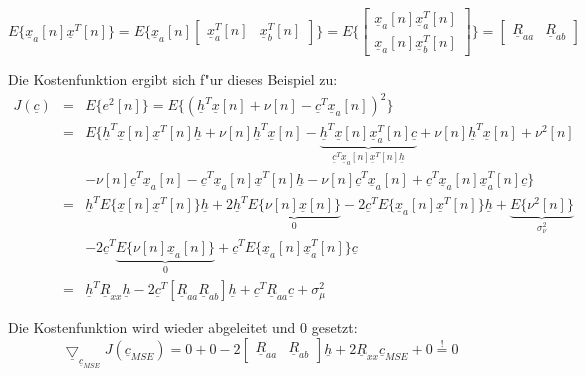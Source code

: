 \begin{equation}
 E\{\underline{x}_a[n] \underline{x}^T[n]\} = E\{\underline{x}_a[n] \begin{bmatrix} \underline{x}_a^T[n] & \underline{x}_b^T[n] \end{bmatrix}\} = E\{\begin{bmatrix} \underline{x}_a[n] \underline{x}_a^T[n] \\ \underline{x}_a[n] \underline{x}_b^T[n] \end{bmatrix}\} = \begin{bmatrix} \underline{R}_{aa} & \underline{R}_{ab} \end{bmatrix}
\end{equation}


Die Kostenfunktion ergibt sich f"ur dieses Beispiel zu:
\begin{eqnarray}
 J(\underline{c}) & = & E\{e^2[n]\} = E\{(\underline{h}^T \underline{x}[n] + \nu [n] - \underline{c}^T \underline{x}_a[n])^2\} \\
 & = & E\{\underline{h}^T \underline{x}[n] \underline{x}^T[n] \underline{h} + \nu [n] \underline{h}^T \underline{x}[n] - \underbrace{\underline{h}^T \underline{x}[n] \underline{x}_a^T[n] \underline{c}}_{\underline{c}^T \underline{x}_a[n] \underline{x}^T[n] \underline{h}} + \nu [n] \underline{h}^T \underline{x}[n] + \nu^2[n] \\
 & & - \nu [n] \underline{c}^T \underline{x}_a[n] - \underline{c}^T \underline{x}_a[n] \underline{x}^T[n] \underline{h} - \nu [n] \underline{c}^T \underline{x}_a[n] + \underline{c}^T \underline{x}_a[n] \underline{x}_a^T[n] \underline{c}\} \\
 & = & \underline{h}^T E\{\underline{x}[n] \underline{x}^T[n]\} \underline{h} + 2 \underline{h}^T \underbrace{E\{\nu [n] \underline{x}[n]\}}_{0} - 2 \underline{c}^T E\{\underline{x}_a[n] \underline{x}^T[n]\} \underline{h} + \underbrace{E\{\nu^2[n]\}}_{\sigma_\nu^2} \\
 & & - 2 \underline{c}^T \underbrace{E\{\nu [n] \underline{x}_a[n]\}}_{0} + \underline{c}^T E\{\underline{x}_a[n] \underline{x}_a^T[n]\} \underline{c} \\
 & = & \underline{h}^T \underline{R}_{xx} \underline{h} - 2 \underline{c}^T [ \underline{R}_{aa} \underline{R}_{ab} ] \underline{h} + \underline{c}^T \underline{R}_{aa} \underline{c} + \sigma_\mu^2
\end{eqnarray}

Die Kostenfunktion wird wieder abgeleitet und 0 gesetzt:
\begin{equation}
 \underline{\bigtriangledown}_{\underline{c}_{MSE}} J(\underline{c}_{MSE}) = 0 + 0 - 2 \begin{bmatrix} \underline{R}_{aa} & \underline{R}_{ab} \end{bmatrix} \underline{h} + 2 \underline{R}_{xx} \underline{c}_{MSE} + 0 \stackrel{!}{=} 0
\end{equation}

